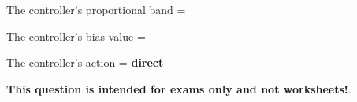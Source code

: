 \vskip 10pt

The controller's proportional band = 

\vskip 10pt

The controller's bias value = 

\vskip 10pt

The controller's action = {\bf direct}







{\bf This question is intended for exams only and not worksheets!}.



